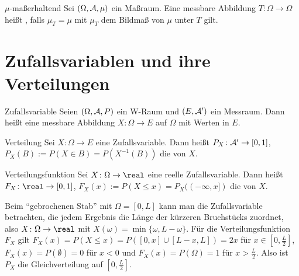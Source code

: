 \begin{Def}{$\mu$-maßerhaltend}
    Sei $(\Omega, \mathcal{A}, \mu)$ ein Maßraum.
    Eine messbare Abbildung $T\colon \Omega \rightarrow \Omega$ heißt ,
    falls $\mu_T = \mu$ mit $\mu_T$ dem Bildmaß von $\mu$ unter $T$ gilt.
\end{Def}

\pagebreak

\section{%
    Zufallsvariablen und ihre Verteilungen%
}

\begin{Def}{Zufallsvariable}
    Seien $(\Omega, \mathcal{A}, P)$ ein W-Raum und $(E, \mathcal{A}')$ ein Messraum.
    Dann heißt eine messbare Abbildung $X\colon \Omega \rightarrow E$
     auf $\Omega$ mit Werten in $E$.
\end{Def}

\begin{Def}{Verteilung}
    Sei $X\colon \Omega \rightarrow E$ eine Zufallsvariable.
    Dann heißt $P_X\colon \mathcal{A}' \rightarrow [0, 1]$, $P_X(B) := P(X \in B) = P(X^{-1}(B))$
    die  von $X$.
\end{Def}

\begin{Def}{Verteilungsfunktion}
    Sei $X\colon \Omega \rightarrow \real$ eine reelle Zufallsvariable.
    Dann heißt $F_X\colon \real \rightarrow [0, 1]$, $F_X(x) := P(X \le x) = P_X((-\infty, x])$
    die  von $X$.
\end{Def}

\begin{Bsp}
    Beim "`gebrochenen Stab"' mit $\Omega = [0, L]$ kann man die Zufallsvariable betrachten,
    die jedem Ergebnis die Länge der kürzeren Bruchstücks zuordnet, also
    $X\colon \Omega \rightarrow \real$ mit $X(\omega) = \min\{\omega, L - \omega\}$.
    Für die Verteilungsfunktion $F_X$ gilt $F_X(x) = P(X \le x) = P([0, x] \cup [L - x, L]) = 2x$
    für $x \in [0, \frac{L}{2}]$,
    $F_X(x) = P(\emptyset) = 0$ für $x < 0$ und $F_X(x) = P(\Omega) = 1$ für $x > \frac{L}{2}$.
    Also ist $P_X$ die Gleichverteilung auf $[0, \frac{L}{2}]$.
\end{Bsp}

\linie

